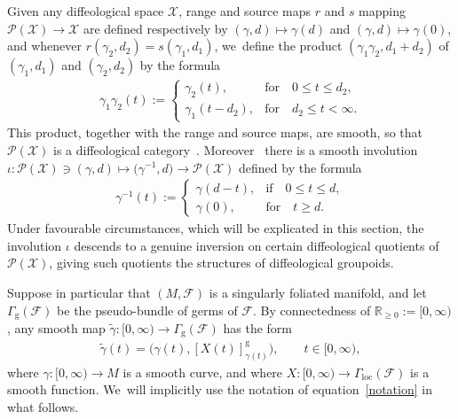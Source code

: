 \documentclass[11pt]{article}
\numberwithin{equation}{section}
\numberwithin{equation}{section}
\def\loc{\operatorname{loc}}
\def\g{\operatorname{g}}
\def\FF{{\mathcal{F}}}
\def\PP{{\mathcal{P}}}
\def\XX{{\mathcal{X}}}
\def\RB{{\mathbb{R}}}
\begin{document}
Given any diffeological space $\XX$, range and source maps $r$ and $s$ mapping $\PP(\XX)\rightarrow \XX$ are defined respectively by $(\gamma,d)\mapsto \gamma(d)$ and $(\gamma,d)\mapsto\gamma(0)$, and whenever $r(\gamma_{2},d_{2}) = s(\gamma_{1},d_{1})$, we~define the product $(\gamma_{1}\gamma_{2},d_{1}+d_{2})$ of $(\gamma_{1},d_{1})$ and $(\gamma_{2},d_{2})$ by the formula
\begin{gather*}
\gamma_{1}\gamma_{2}(t):=
\begin{cases}
\gamma_{2}(t),&\text{for}\quad 0\leq t\leq d_{2},
\\
\gamma_{1}(t-d_{2}),&\text{for}\quad d_{2}\leq t<\infty.
\end{cases}
\end{gather*}
This product, together with the range and source maps, are smooth, so that $\PP(\XX)$ is a dif\-feo\-lo\-gi\-cal category~\cite[Proposition~3.22]{mac3}. Moreover~\cite[Proposition~3.23]{mac3} there is a smooth involution $\iota\colon \PP(\XX)\ni(\gamma,d)\mapsto\big(\gamma^{-1},d\big)\rightarrow\PP(\XX)$ defined by the formula
\begin{gather*}
\gamma^{-1}(t):=
\begin{cases}
\gamma(d-t),&\text{if}\quad 0\leq t\leq d,
\\
\gamma(0),&\text{for}\quad t\geq d.
\end{cases}
\end{gather*}
Under favourable circumstances, which will be explicated in this section, the involution $\iota$ des\-cends to a genuine inversion on certain diffeological quotients of $\PP(\XX)$, giving such quotients the structures of diffeological groupoids.

Suppose in particular that $(M,\FF)$ is a singularly foliated manifold, and let $\Gamma_{\g}(\FF)$ be the pseudo-bundle of germs of $\FF$. By connectedness of $\RB_{\geq0}:=[0,\infty)$, any smooth map $\tilde{\gamma}\colon [0,\infty)\rightarrow\Gamma_{\g}(\FF)$ has the form
\begin{gather}\label{notation}
\tilde{\gamma}(t) = \big(\gamma(t),[X(t)]^{\g}_{\gamma(t)}\big),\qquad t\in[0,\infty),
\end{gather}
where $\gamma\colon [0,\infty)\rightarrow M$ is a smooth curve, and where $X\colon [0,\infty)\rightarrow\Gamma_{\loc}(\FF)$ is a smooth function. We~will implicitly use the notation of equation~\eqref{notation} in what follows.
\end{document}
